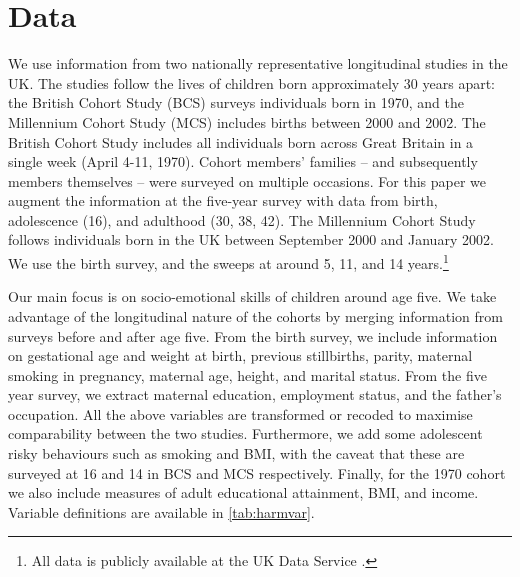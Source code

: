 
\section{Data \label{sec:data}}

We use information from two nationally representative longitudinal studies in the UK. The studies follow the lives of children born approximately 30 years apart: the British Cohort Study (BCS) surveys individuals born in 1970, and the Millennium Cohort Study (MCS) includes births between 2000 and 2002. The British Cohort Study includes all individuals born across Great Britain in a single week (April 4-11, 1970). Cohort members' families -- and subsequently members themselves -- were surveyed on multiple occasions. For this paper we augment the information at the five-year survey with data from birth, adolescence (16), and adulthood (30, 38, 42). The Millennium Cohort Study follows individuals born in the UK between September 2000 and January 2002. We use the birth survey, and the sweeps at around 5, 11, and 14 years.\footnote{All data is publicly available at the UK Data Service \citep{Chamberlain2013,Butler2016a,Butler2016b,Butler2017,UniversityOfLondon.InstituteOfEducation.CentreForLongitudinalStudies2016b,UniversityOfLondon.InstituteOfEducation.CentreForLongitudinalStudies2016,UniversityOfLondon.InstituteOfEducation.CentreForLongitudinalStudies2016a,UniversityOfLondon.InstituteOfEducation.CentreForLongitudinalStudies2017b,UniversityOfLondon.InstituteOfEducation.CentreForLongitudinalStudies2017,UniversityOfLondon.InstituteOfEducation.CentreForLongitudinalStudies2017a,UniversityOfLondon.InstituteOfEducation.CentreForLongitudinalStudies2017c}.}

Our main focus is on socio-emotional skills of children around age five. We take advantage of the longitudinal nature of the cohorts by merging information from surveys before and after age five. From the birth survey, we include information on gestational age and weight at birth, previous stillbirths, parity, maternal smoking in pregnancy, maternal age, height, and marital status. From the five year survey, we extract maternal education, employment status, and the father's occupation. All the above variables are transformed or recoded to maximise comparability between the two studies. Furthermore, we add some adolescent risky behaviours such as smoking and BMI, with the caveat that these are surveyed at 16 and 14 in BCS and MCS respectively. Finally, for the 1970 cohort we also include measures of adult educational attainment, BMI, and income. Variable definitions are available in \autoref{tab:harmvar}.

